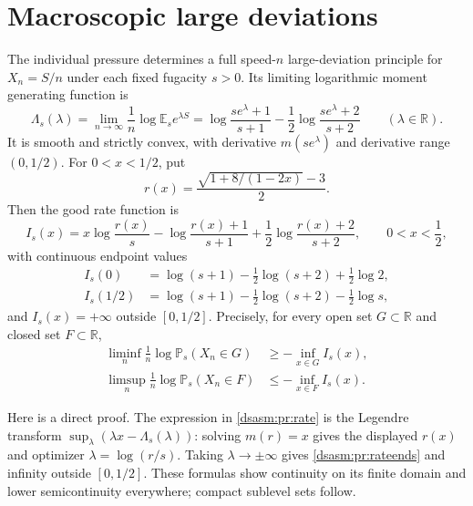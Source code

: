 \documentclass[11pt,letterpaper]{article}
\theoremstyle{remark}\newtheorem{remark}[theorem]{Remark}
\newcommand{\R}{\mathbb R}\newcommand{\C}{\mathbb C}\newcommand{\N}{\mathbb N}
\begin{document}
\section{Macroscopic large deviations}
\label{dsasm:pr:sec:ldp}
The individual pressure determines a full speed-$n$ large-deviation
principle for $X_n=S/n$ under each fixed fugacity $s>0$. Its limiting
logarithmic moment generating function is
\begin{equation}\label{dsasm:pr:scgf}
 \Lambda_s(\lambda)
 =\lim_{n\to\infty}\frac1n\log\mathbb E_s e^{\lambda S}
 =\log\frac{se^\lambda+1}{s+1}
      -\frac12\log\frac{se^\lambda+2}{s+2}\qquad(\lambda\in\R).
\end{equation}
It is smooth and strictly convex, with derivative $m(se^\lambda)$
and derivative range $(0,1/2)$.
For $0<x<1/2$, put
\[
 r(x)=\frac{\sqrt{1+8/(1-2x)}-3}{2}.
\]
Then the good rate function is
\begin{equation}\label{dsasm:pr:rate}
 I_s(x)=x\log\frac{r(x)}s
       -\log\frac{r(x)+1}{s+1}
       +\frac12\log\frac{r(x)+2}{s+2},
 \qquad 0<x<\frac12,
\end{equation}
with continuous endpoint values
\begin{equation}\label{dsasm:pr:rateends}
\begin{split}
 I_s(0)&=\log(s+1)-\tfrac12\log(s+2)+\tfrac12\log2,\\
 I_s(1/2)&=\log(s+1)-\tfrac12\log(s+2)-\tfrac12\log s,
\end{split}
\end{equation}
and $I_s(x)=+\infty$ outside $[0,1/2]$. Precisely, for every open
set $G\subset\R$ and closed set $F\subset\R$,
\begin{equation}\label{dsasm:pr:ldp}
\begin{split}
 \liminf_n\frac1n\log\mathbb P_s(X_n\in G)&\ge-\inf_{x\in G}I_s(x),\\
 \limsup_n\frac1n\log\mathbb P_s(X_n\in F)&\le-\inf_{x\in F}I_s(x).
\end{split}
\end{equation}

Here is a direct proof. The expression in \eqref{dsasm:pr:rate} is the Legendre
transform $\sup_\lambda(\lambda x-\Lambda_s(\lambda))$: solving
$m(r)=x$ gives the displayed $r(x)$ and optimizer $\lambda=\log(r/s)$.
Taking $\lambda\to\pm\infty$ gives \eqref{dsasm:pr:rateends} and infinity
outside $[0,1/2]$. These formulas show continuity on its finite domain
and lower semicontinuity everywhere; compact sublevel sets follow.
\end{document}
